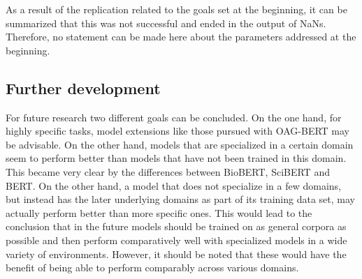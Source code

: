 As a result of the replication related to the goals set at the beginning, it can be summarized that this was not successful and ended in the output of NaNs. Therefore, no statement can be made here about the parameters addressed at the beginning.
\subsection{Further development}
For future research two different goals can be concluded. On the one hand, for highly specific tasks, model extensions like those pursued with OAG-BERT may be advisable. On the other hand, models that are specialized in a certain domain seem to perform better than models that have not been trained in this domain. This became very clear by the differences between BioBERT, SciBERT and BERT. On the other hand, a model that does not specialize in a few domains, but instead has the later underlying domains as part of its training data set, may actually perform better than more specific ones. This would lead to the conclusion that in the future models should be trained on as general corpora as possible and then perform comparatively well with specialized models in a wide variety of environments. However, it should be noted that these would have the benefit of being able to perform comparably across various domains. 
